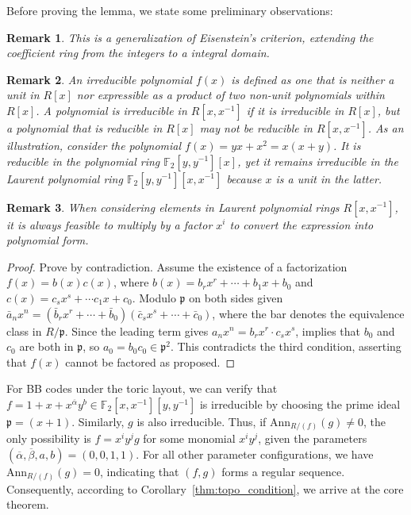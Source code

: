 \documentclass[aps,prl,english,superscriptaddress,twocolumn,tightenlines,showpacs,longbibliography,floatfix,amsfonts]{revtex4-2}
\newtheorem{rem}{Remark}
\begin{document}
Before proving the lemma, we state some preliminary observations:
\begin{rem}
	This is a generalization of Eisenstein's criterion, extending the coefficient ring from the integers to a  integral domain.
\end{rem}
\begin{rem}
	An irreducible polynomial $f(x)$ is defined as one that is neither a unit in $R[x]$ nor expressible as a product of two non-unit polynomials within $R[x]$. A polynomial is irreducible in $R[x,x^{-1}]$ if it is irreducible in $R[x]$, but a polynomial that is reducible in $R[x]$ may not be reducible in $R[x, x^{-1}]$. As an illustration, consider the polynomial $f(x) = yx+x^2=x(x+y)$.  It is reducible in the polynomial ring $\mathbb{F}_2[y,y^{-1}][x]$, yet it remains irreducible in the Laurent polynomial ring $\mathbb{F}_2[y,y^{-1}][x,x^{-1}]$ because $x$ is a unit in the latter.
\end{rem}
\begin{rem}
	When considering elements in Laurent polynomial rings $R[x,x^{-1}]$, it is always feasible to multiply by a factor $x^i$ to convert the expression into polynomial form.
\end{rem}
\begin{proof}
	Prove by contradiction. Assume the existence of a factorization $f(x) = b(x)c(x)$, where $b(x) = b_r x^r + \cdots + b_1x + b_0$ and $c(x)=c_s x^s + \cdots c_1 x + c_0$. Modulo $\mathfrak{p}$ on both sides given $\bar{a}_n x^n = (\bar{b}_r x^r+\cdots+\bar{b}_0)(\bar{c}_s x^s + \cdots +\bar{c}_0)$, where the bar denotes the equivalence class in $R/\mathfrak{p}$. Since the leading term gives $a_nx^n=b_rx^r\cdot c_s x^s$, implies that $b_0$ and $c_0$ are both in $\mathfrak{p}$, so $a_0=b_0c_0 \in \mathfrak{p}^2$. This contradicts the third condition, asserting that $f(x)$ cannot be factored as proposed.
\end{proof}

For BB codes under the toric layout, we can verify that $f =1+x+ x^{\overline{\alpha}}y^b \in \mathbb{F}_2[x,x^{-1}][y,y^{-1}]$ is irreducible by choosing the prime ideal $\mathfrak{p}=(x+1)$. Similarly, $g$ is also irreducible. Thus, if $\mathrm{Ann}_{R/(f)}(g)\ne 0$, the only possibility is $f = x^iy^jg$ for some monomial $x^iy^j$, given the parameters $(\overline{\alpha},\overline{\beta},a,b)=(0,0,1,1)$.  For all other parameter configurations, we have $\mathrm{Ann}_{R/(f)}(g)=0$, indicating that $(f,g)$ forms a regular sequence. Consequently, according to Corollary~\ref{thm:topo_condition}, we arrive at the core theorem.
\end{document}
